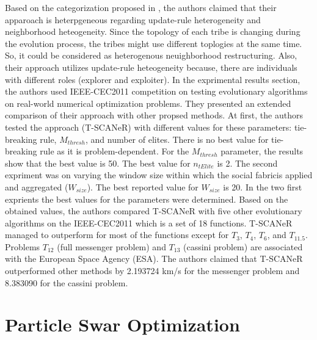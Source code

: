 Based on the categorization proposed in \cite{de2009heterogeneous}, the authors claimed that their apparoach is heterpgeneous regarding update-rule heterogeneity and neighborhood heteogeneity. Since the topology of each tribe is changing during the evolution process, the tribes might use different toplogies at the same time. So, it could be considered as heterogenous neuighborhood restructuring. Also, their approach utilizes update-rule heteogeneity because, there are individuals with different roles (explorer and exploiter). \newline
In the exprimental results section, the authors used IEEE-CEC2011 competition on testing evolutionary algorithms on real-world numerical optimization problems. They presented an extended comparison of their approach with other propsed methods. At first, the authors tested the approach (T-SCANeR) with different values for these parameters: tie-breaking rule, $M_{thresh}$, and number of elites. There is no best value for tie-breaking rule as it is problem-dependent. For the $M_{thresh}$ parameter, the results show that the best value is 50. The best value for $n_{tElite}$ is 2. The second expriment was on varying the  window  size  within  which  the  social  fabricis  applied  and  aggregated ($W_{size}$). The best reported value for $W_{size}$ is 20. \newline
In the two first exprients the best values for the parameters were determined. Based on the obtained values, the authors compared T-SCANeR with five other evolutionary algorithms on the IEEE-CEC2011 which is a set of 18 functions. T-SCANeR managed to outperform for most of the functions except for $T_{3}$, $T_{4}$, $T_{6}$, and $T_{11.5}$. Problems $T_{12}$ (full messenger problem) and $T_{13}$ (cassini problem) are associated with the European Space Agency (ESA). The authors claimed that T-SCANeR outperformed other methods by 2.193724 km/s for the messenger problem and 8.383090 for the cassini problem.
\section{Particle Swar Optimization}
